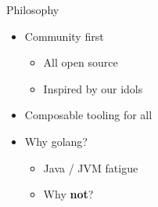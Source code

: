 \begin{frame}{Philosophy}

  \begin{itemize}
    \item Community first
      \begin{itemize}
        \item All open source
        \item Inspired by our idols
      \end{itemize}
    \item Composable tooling for all
    \item Why golang?
      \begin{itemize}
        \item Java / JVM fatigue
        \item Why \textbf{not}?
      \end{itemize}
  \end{itemize}


\end{frame}
